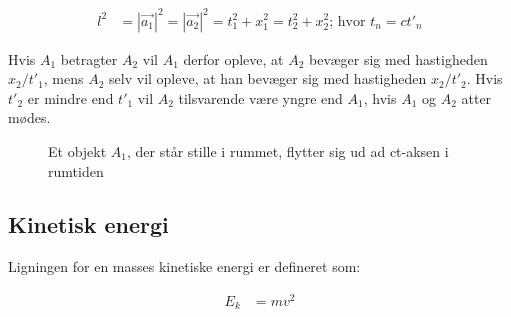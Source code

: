 \documentclass[11pt,a4paper]{memoir}
\begin{document}
\begin{equation}
\begin{aligned}
l^2 &= |\vec{a_1}|^2 = |\vec{a_2}|^2 = t_1^2 + x_1^2 = t_2^2 + x_2^2\text{; hvor }t_n = ct'_n
\end{aligned}
\end{equation}
\par
Hvis $A_1$ betragter $A_2$ vil $A_1$ derfor opleve, at $A_2$ bevæger sig med hastigheden $x_2/t'_1$, mens $A_2$ selv vil opleve, at han bevæger sig med hastigheden $x_2/t'_2$. Hvis $t'_2$ er mindre end $t'_1$ vil $A_2$ tilsvarende være yngre end $A_1$, hvis $A_1$ og $A_2$ atter mødes.

\begin{figure}
\caption{Et objekt $A_1$, der står stille i rummet, flytter sig ud ad ct-aksen i rumtiden}
\label{fig:A_1}
\end{figure}

\subsection{Kinetisk energi}
Ligningen for en masses kinetiske energi er defineret som:

\begin{equation}
\begin{aligned}
E_k &= mv^2
\end{aligned}
\end{equation}
\end{document}
